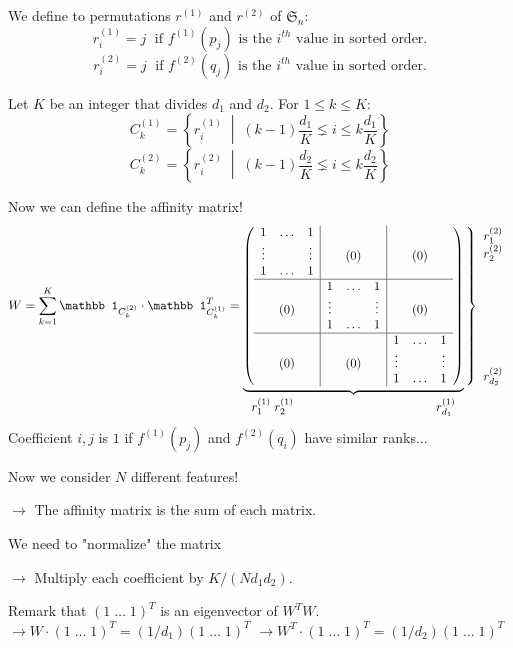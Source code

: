 \documentclass{beamer}
\begin{document}
\begin{frame}
  \medskip We define to permutations $r^{(1)}$ and $r^{(2)}$ of $\mathfrak S_n$:
  \[r^{(1)}_i = j \;\text{ if }f^{(1)}(p_j)\text{ is the }i^{th}\text{ value in sorted order.}\]
  \[r^{(2)}_i = j \;\text{ if }f^{(2)}(q_j)\text{ is the }i^{th}\text{ value in sorted order.}\]
  
  \medskip Let $K$ be an integer that divides $d_1$ and $d_2$. For $1 \leq k \leq K$:
  \[C_k^{(1)} = \left\{r^{(1)}_i \;\middle|\; (k-1)\frac{d_1}{K} \lneq i \leq k\frac{d_1}{K} \right\}\]
  \[C_k^{(2)} = \left\{r^{(2)}_i \;\middle|\; (k-1)\frac{d_2}{K} \lneq i \leq k\frac{d_2}{K} \right\}\]
\end{frame}

\begin{frame}
Now we can define the affinity matrix!
\[W = \sum_{k=1}^K \mathbb 1_{C^{(2)}_k} \cdot \mathbb 1_{C^{(1)}_k}^T = \underbrace{\left(\begin{array}{ccc|ccc|ccc}
1 & \dots & 1 & && & && \\
\vdots & & \vdots & &(0)& & &(0)& \\
1 & \dots & 1 & && & && \\\hline
&& & 1 & \dots & 1 & &&\\
&(0)& & \vdots & & \vdots & &(0)&\\
&& & 1 & \dots & 1 & &&\\\hline
&& & && & 1 & \dots & 1\\
&(0)& & &(0)& & \vdots && \vdots\\
&& & && & 1 & \dots & 1\\
\end{array}\right)}_{\displaystyle r^{(1)}_1 \; r^{(1)}_2 \hspace{4cm} r^{(1)}_{d_1}}\left\}\begin{array}{c}r^{(2)}_1\\r^{(2)}_2\\\\\\\\\\\\\\\\r^{(2)}_{d_2}\end{array}\right.\]
Coefficient $i,j$ is $1$ if $f^{(1)}(p_j)$ and $f^{(2)}(q_i)$ have similar ranks...
\end{frame}

\begin{frame}
  Now we consider $N$ different features!
  \par$\rightarrow$ The affinity matrix is the sum of each matrix.
  \par\bigskip
  We need to "normalize" the matrix
  \par$\rightarrow$ Multiply each coefficient by $K/(Nd_1d_2)$.
  \par\bigskip Remark that $(1\;\dots\;1)^T$ is an eigenvector of $W^TW$.
  $\rightarrow W \cdot (1\;\dots\;1)^T = (1/d_1)(1\;\dots\;1)^T$
  $\rightarrow W^T \cdot (1\;\dots\;1)^T = (1/d_2)(1\;\dots\;1)^T$
\end{frame}
\end{document}
